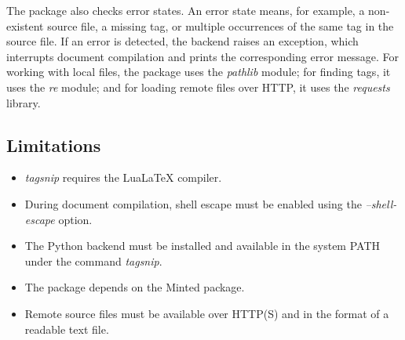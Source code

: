 \documentclass{article}
\begin{document}
The package also checks error states. An error state means, for example, a non-existent source file, 
a missing tag, or multiple occurrences of the same tag in the source file. If an error is detected, 
the backend raises an exception, which interrupts document compilation and prints the corresponding error message. 
For working with local files, the package uses the \textit{pathlib} module; for finding tags, it uses the \textit{re} module; 
and for loading remote files over HTTP, it uses the \textit{requests} library.

\subsection*{Limitations}

\begin{itemize}
    \item \textit{tagsnip} requires the Lua\LaTeX{} compiler.
    
    \item During document compilation, 
    shell escape must be enabled using the \textit{--shell-escape} option.

    \item The Python backend must be installed and available in the system PATH 
    under the command \textit{tagsnip}.

    \item The package depends on the Minted package.

    \item Remote source files must be available over HTTP(S) and in the format of 
    a readable text file.
\end{itemize}



\end{document}

